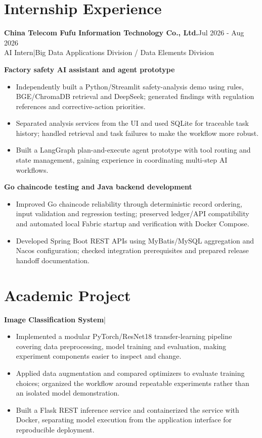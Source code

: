 \documentclass[11pt,a4paper]{article}
\newcommand{\project}[1]{\par\vspace{2pt}\textbf{#1}\par}
\begin{document}
\section*{Internship Experience}
\textbf{China Telecom Fufu Information Technology Co., Ltd.}\hfill Jul 2026 - Aug 2026\\
AI Intern\enspace|\enspace Big Data Applications Division / Data Elements Division
\project{Factory safety AI assistant and agent prototype}
\begin{itemize}
\item Independently built a Python/Streamlit safety-analysis demo using rules, BGE/ChromaDB retrieval and DeepSeek; generated findings with regulation references and corrective-action priorities.
\item Separated analysis services from the UI and used SQLite for traceable task history; handled retrieval and task failures to make the workflow more robust.
\item Built a LangGraph plan-and-execute agent prototype with tool routing and state management, gaining experience in coordinating multi-step AI workflows.
\end{itemize}
\project{Go chaincode testing and Java backend development}
\begin{itemize}
\item Improved Go chaincode reliability through deterministic record ordering, input validation and regression testing; preserved ledger/API compatibility and automated local Fabric startup and verification with Docker Compose.
\item Developed Spring Boot REST APIs using MyBatis/MySQL aggregation and Nacos configuration; checked integration prerequisites and prepared release handoff documentation.
\end{itemize}

\section*{Academic Project}
\textbf{Image Classification System}\enspace|
\begin{itemize}
\item Implemented a modular PyTorch/ResNet18 transfer-learning pipeline covering data preprocessing, model training and evaluation, making experiment components easier to inspect and change.
\item Applied data augmentation and compared optimizers to evaluate training choices; organized the workflow around repeatable experiments rather than an isolated model demonstration.
\item Built a Flask REST inference service and containerized the service with Docker, separating model execution from the application interface for reproducible deployment.
\end{itemize}
\end{document}
